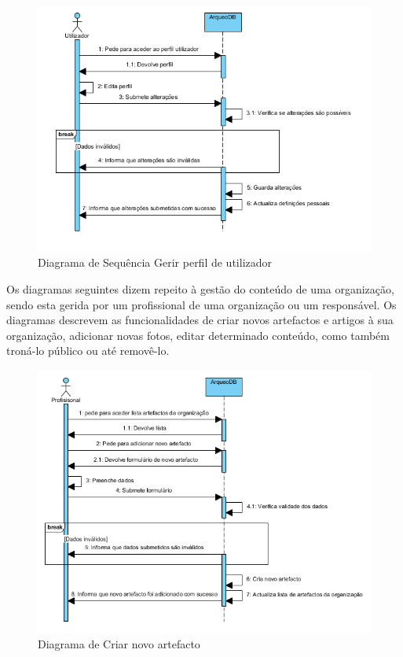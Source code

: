 \documentclass[12pt,a4paper]{article}
\begin{document}
\begin{figure}[h!]
\centering
\includegraphics[scale=1]{sequencia/gerirperfil}
\caption{Diagrama de Sequência Gerir perfil de utilizador} 
\end{figure}


\clearpage
Os diagramas seguintes dizem repeito à gestão do conteúdo de uma organização, sendo esta gerida por um profissional de uma organização ou um responsável. Os diagramas descrevem as funcionalidades de criar novos artefactos e artigos à sua organização, adicionar novas fotos, editar determinado conteúdo, como também troná-lo público ou até removê-lo.\\

\begin{figure}[h!]
\centering
\includegraphics[scale=1]{sequencia/criarartefacto}
\caption{Diagrama de Criar novo artefacto} 
\end{figure}
\end{document}

